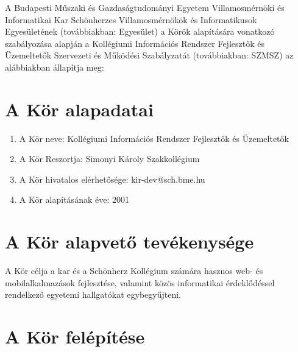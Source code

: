 \documentclass[12pt]{article}
\begin{document}
\FirstPage
\pagebreak

A Budapesti Műszaki és Gazdaságtudományi Egyetem Villamosmérnöki és Informatikai Kar Schönherzes 
Villamosmérnökök és Informatikusok Egyesületének (továbbiakban: Egyesület) a Körök alapítására 
vonatkozó szabályozása alapján a Kollégiumi Információs Rendszer Fejlesztők és Üzemeltetők 
Szervezeti és Működési Szabályzatát (továbbiakban: SZMSZ) az alábbiakban állapítja meg:

\section{A Kör alapadatai}

\begin{enumerate}
  \item A Kör neve: Kollégiumi Információs Rendszer Fejlesztők és Üzemeltetők
  \item A Kör Reszortja: Simonyi Károly Szakkollégium
  \item A Kör hivatalos elérhetősége: kir-dev@sch.bme.hu
  \item A Kör alapításának éve: 2001
\end{enumerate}


\section{A Kör alapvető tevékenysége}

A Kör célja a kar és a Schönherz Kollégium számára hasznos web- és mobilalkalmazások fejlesztése, 
valamint közös informatikai érdeklődéssel rendelkező egyetemi hallgatókat egybegyűjteni.


\section{A Kör felépítése}
\end{document}
